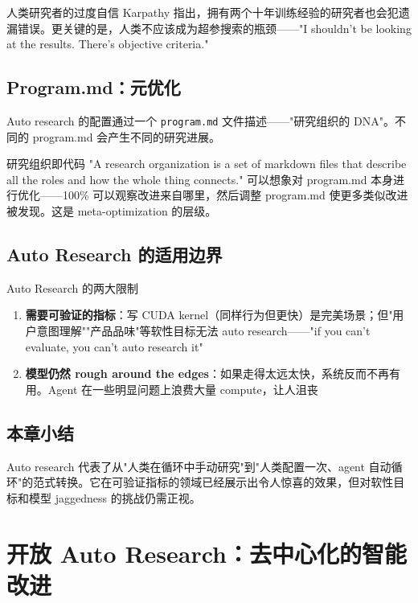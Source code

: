 \documentclass[a4paper]{article}
\begin{document}
\begin{warningbox}{人类研究者的过度自信}
Karpathy 指出，拥有两个十年训练经验的研究者也会犯遗漏错误。更关键的是，人类不应该成为超参搜索的瓶颈——"I shouldn't be looking at the results. There's objective criteria."
\end{warningbox}

\subsection{Program.md：元优化}

Auto research 的配置通过一个 \texttt{program.md} 文件描述——"研究组织的 DNA"。不同的 program.md 会产生不同的研究进展。

\begin{importantbox}{研究组织即代码}
"A research organization is a set of markdown files that describe all the roles and how the whole thing connects." 可以想象对 program.md 本身进行优化——100\% 可以观察改进来自哪里，然后调整 program.md 使更多类似改进被发现。这是 meta-optimization 的层级。
\end{importantbox}

\subsection{Auto Research 的适用边界}

\begin{warningbox}{Auto Research 的两大限制}
\begin{enumerate}
    \item \textbf{需要可验证的指标}：写 CUDA kernel（同样行为但更快）是完美场景；但"用户意图理解""产品品味"等软性目标无法 auto research——"if you can't evaluate, you can't auto research it"
    \item \textbf{模型仍然 rough around the edges}：如果走得太远太快，系统反而不再有用。Agent 在一些明显问题上浪费大量 compute，让人沮丧
\end{enumerate}
\end{warningbox}

\subsection{本章小结}

Auto research 代表了从"人类在循环中手动研究"到"人类配置一次、agent 自动循环"的范式转换。它在可验证指标的领域已经展示出令人惊喜的效果，但对软性目标和模型 jaggedness 的挑战仍需正视。


\section{开放 Auto Research：去中心化的智能改进}
\end{document}
